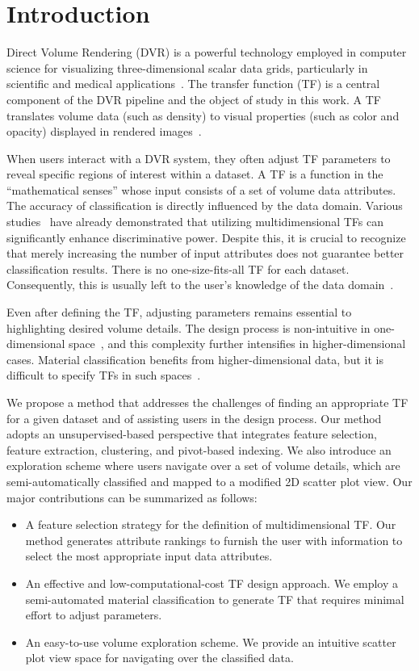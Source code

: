 \section{Introduction}
\label{sect:introduction}
Direct Volume Rendering (DVR) is a powerful technology employed in computer science for visualizing three-dimensional scalar data grids, particularly in scientific and medical applications~\cite{elvins1992, xu2021}. The transfer function (TF) is a central component of the DVR pipeline and the object of study in this work. A TF translates volume data (such as density) to visual properties (such as color and opacity) displayed in rendered images~\cite{ljung2016}.

When users interact with a DVR system, they often adjust TF parameters to reveal specific regions of interest within a dataset. A TF is a function in the ``mathematical senses'' whose input consists of a set of volume data attributes. The accuracy of classification is directly influenced by the data domain. Various studies~\cite{ljung2016, cai2017, pfister2001, roettger2005} have already demonstrated that utilizing multidimensional TFs can significantly enhance discriminative power. Despite this, it is crucial to recognize that merely increasing the number of input attributes does not guarantee better classification results. There is no one-size-fits-all TF for each dataset. Consequently, this is usually left to the user's knowledge of the data domain~\cite{arens2010}.

Even after defining the TF, adjusting parameters remains essential to highlighting desired volume details. The design process is non-intuitive in one-dimensional space~\cite{pfister2001, wang2011}, and this complexity further intensifies in higher-dimensional cases. Material classification benefits from higher-dimensional data, but it is difficult to specify TFs in such spaces~\cite{ljung2016, pfister2001, kniss2002, pan2024}.  

We propose a method that addresses the challenges of finding an appropriate TF for a given dataset and of assisting users in the design process. Our method adopts an unsupervised-based perspective that integrates feature selection, feature extraction, clustering, and pivot-based indexing. We also introduce an exploration scheme where users navigate over a set of volume details, which are semi-automatically classified and mapped to a modified 2D scatter plot view. Our major contributions can be summarized as follows:
\begin{itemize}
    \item A feature selection strategy for the definition of multidimensional TF. Our method generates attribute rankings to furnish the user with information to select the most appropriate input data attributes.
    \item An effective and low-computational-cost TF design approach. We employ a semi-automated material classification to generate TF that requires minimal effort to adjust parameters.
    \item An easy-to-use volume exploration scheme. We provide an intuitive scatter plot view space for navigating over the classified data.
\end{itemize}

